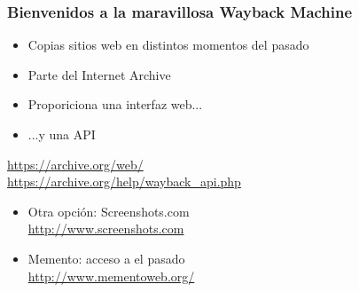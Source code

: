 \begin{frame}
\frametitle{Bienvenidos a la maravillosa Wayback Machine}

{\Large
\begin{itemize}
\item Copias sitios web en distintos momentos del pasado
\item Parte del Internet Archive
\item Proporiciona una interfaz web...
\item ...y una API
\end{itemize}

\begin{flushright}
\url{https://archive.org/web/} \\
\url{https://archive.org/help/wayback_api.php} \\
\end{flushright}

\begin{itemize}
\item Otra opción: Screenshots.com \\
  \url{http://www.screenshots.com} \\
\item Memento: acceso a el pasado \\
  \url{http://www.mementoweb.org/} \\
\end{itemize}
}


\end{frame}


